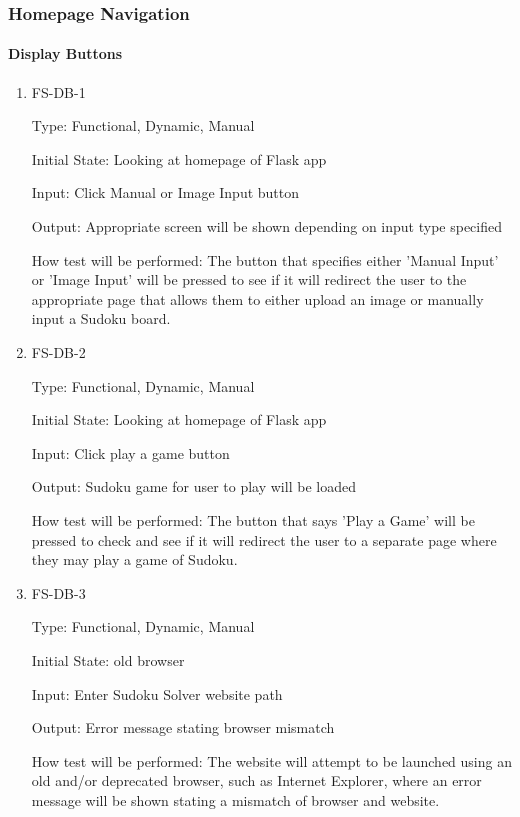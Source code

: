 \documentclass[11pt]{article}
\begin{document}
\subsubsection{Homepage Navigation}
		
\paragraph{Display Buttons}

\begin{enumerate}

\item{FS-DB-1\\}

Type: Functional, Dynamic, Manual
					
Initial State: Looking at homepage of Flask app
					
Input: Click Manual or Image Input button
					
Output: Appropriate screen will be shown depending on input type specified
					
How test will be performed: The button that specifies either 'Manual Input' or 'Image Input' will be pressed to see if it will redirect the user to the appropriate page that allows them to either upload an image or manually input a Sudoku board.
					
\item{FS-DB-2\\}

Type: Functional, Dynamic, Manual
					
Initial State: Looking at homepage of Flask app
					
Input: Click play a game button
					
Output: Sudoku game for user to play will be loaded
					
How test will be performed: The button that says 'Play a Game' will be pressed to check and see if it will redirect the user to a separate page where they may play a game of Sudoku.

\item{FS-DB-3\\}

Type: Functional, Dynamic, Manual
					
Initial State: old browser
					
Input: Enter Sudoku Solver website path
					
Output: Error message stating browser mismatch
					
How test will be performed: The website will attempt to be launched using an old and/or deprecated browser, such as Internet Explorer, where an error message will be shown stating a mismatch of browser and website.

\end{enumerate}
\end{document}
